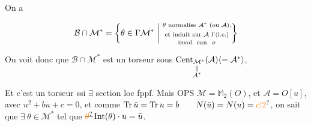 On a

\[
\mathcal B\cap\mathcal M^*=\left\{\theta\in\Gamma\mathcal M^*\ \middle|\
\substack{\theta\text{ normalise }\mathcal A^*\text{ (ou }\mathcal A\text{),}\\\text{et induit sur }\mathcal A\text{ l'}\inserted{\text{i.e.}}\strut\\\text{invol. can. }\sigma}\right\}
\]

On voit donc que $\mathcal B\cap\mathcal M^*$ est un torseur sous $\underset{\substack{\Vert\\\mathcal A^*}}{\operatorname{Cent}_{\mathcal M^*}(\mathcal A)}\inserted{=\mathcal A^*}$,

Et c'est un torseur ssi $\exists$ section loc fppf. Mais  OPS $\mathcal M=\mathbb M_2(O)$, et  $\mathcal A=O[u]$, avec $u^2+bu+c=0$, et comme $\operatorname{Tr}\bar u=\operatorname{Tr}u=b\qquad N(\bar u)=N(u)=\unsure{c|2}$, on sait que $\exists\ \theta\in\mathcal M^*$ tel que $\deleted{\unsure{\theta}}\operatorname{Int}(\theta)\cdot u=\bar u$.
